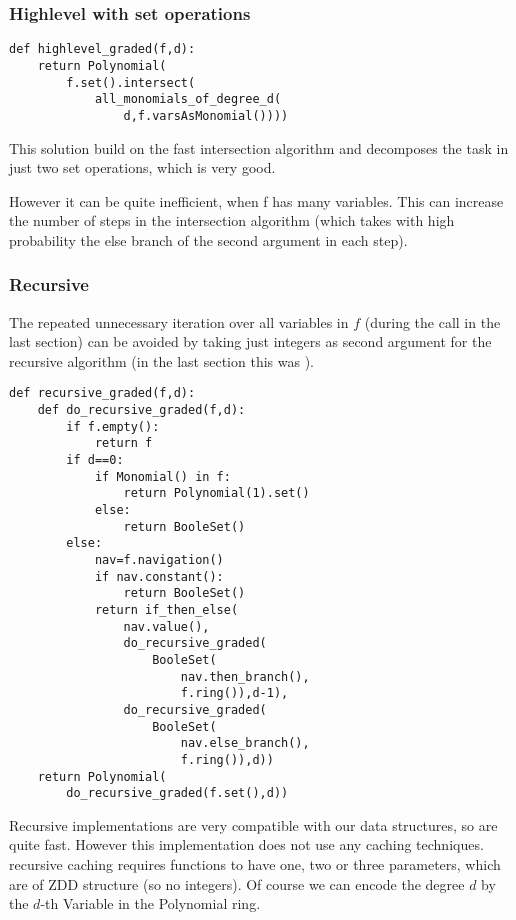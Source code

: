 \subsubsection{Highlevel with set operations}
\begin{lstlisting}
def highlevel_graded(f,d):
    return Polynomial(
        f.set().intersect(
            all_monomials_of_degree_d(
                d,f.varsAsMonomial())))
\end{lstlisting}
This solution build on the fast intersection algorithm and decomposes the task in just two set operations, which is very good.

However it can be quite inefficient, when f has many variables.
This can increase the number of steps in the intersection algorithm (which takes with high probability the else branch of the second argument in each step).

\subsubsection{Recursive}
The repeated unnecessary iteration over all variables in $f$ (during the  call in the last section) can be avoided by taking just integers as second argument for the recursive algorithm (in the last section this was ).

\begin{lstlisting}
def recursive_graded(f,d):
    def do_recursive_graded(f,d):
        if f.empty():
            return f
        if d==0:
            if Monomial() in f:
                return Polynomial(1).set()
            else:
                return BooleSet()
        else:
            nav=f.navigation()
            if nav.constant():
                return BooleSet()
            return if_then_else(
                nav.value(),
                do_recursive_graded(
                    BooleSet(
                        nav.then_branch(),
                        f.ring()),d-1),
                do_recursive_graded(
                    BooleSet(
                        nav.else_branch(),
                        f.ring()),d))
    return Polynomial(
        do_recursive_graded(f.set(),d))
\end{lstlisting}
Recursive implementations are very compatible with our data structures, so are quite fast. However this implementation does not use any caching techniques. \CUDD recursive caching requires functions to have one, two or three parameters, which are of ZDD structure (so no integers).
Of course we can encode the degree $d$ by the $d$-th Variable in the Polynomial
ring.

